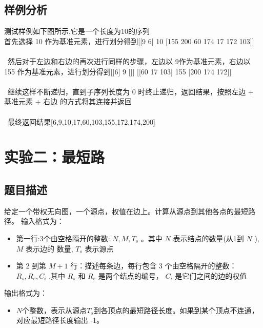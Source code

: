\documentclass[UTF8,a4paperdui, %
]{ctexart}
\begin{document}
\subsection{样例分析}
测试样例如下图所示,它是一个长度为10的序列
\\
首先选择 10 作为基准元素，进行划分得到[[9 6] 10 [155 200 60 174 17 172 103]]\\
\\\
然后对于左边和右边的再次进行同样的步骤，左边以 9作为基准元素，右边以 155 作为基准元素，进行划分得到[[6] 9 []] [[60 17 103] 155 [200 174 172]]\\
\\\
继续这样不断递归，直到子序列长度为 0 时终止递归，返回结果，按照左边 + 基准元素 + 右边 的方式将其连接并返回\\
\\\
最终返回结果[6,9,10,17,60,103,155,172,174,200]

\newpage
\section{实验二：最短路}

\subsection{题目描述}
给定一个带权无向图，一个源点，权值在边上。计算从源点到其他各点的最短路径。
输入格式为：
\begin{itemize}
    \item 第一行:3个由空格隔开的整数: $N, M, T_s$ 。其中 $N$ 表示结点的数量(从1到 $N$ ), $M$ 表示边的 数量, $T_s$ 表示源点
    \item  第 2 到第 $M+1$ 行：描述每条边，每行包含 3 个由空格隔开的整数： $R_s, R_e, C_i$ ,其中 $R_s$ 和 $R_e$ 是两个结点的编号， $C_i$ 是它们之间的边的权值
\end{itemize}
输出格式为：
\begin{itemize}
    \item $N$个整数，表示从源点$T_s$到各顶点的最短路径长度。如果到某个顶点不连通，对应最短路径长度输出 -1。
\end{itemize}
\end{document}
